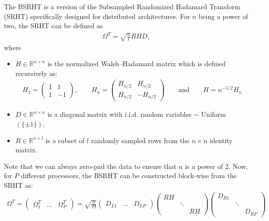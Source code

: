 \documentclass{article}
\theoremstyle{definition}
\begin{document}
The BSRHT is a version of the Subsampled Randomized Hadamard Transform (SRHT)
specifically designed for distributed architectures. For $n$ being a power of
two, the SRHT can be defined as
\begin{align*}
    \Omega^T = \sqrt{\frac{n}{l}} R H D,
\end{align*}
where
\begin{itemize}
    \item $H\in \mathbb{R}^{n \times n}$ is the normalized Walsh–Hadamard matrix
            which is defined recursively as:
    \begin{align*}
        H_2 = \begin{pmatrix}
            1 & 1 \\
            1 & -1
        \end{pmatrix},
        \qquad
        H_n = \begin{pmatrix}
            H_{n/2} & H_{n/2}\\
            H_{n/2} & -H_{n/2}
        \end{pmatrix}
        \qquad \text{and} \qquad
        H = n^{-1/2} H_n
    \end{align*}
    \item $D\in \mathbb{R}^{n \times n}$ is a diagonal matrix with i.i.d. random
            variables $\sim$ Uniform$(\{\pm 1\})$.
    \item $R\in \mathbb{R}^{n \times l}$ is a subset of $l$ randomly sampled
            rows from the $n \times n$ identity matrix.
\end{itemize}
Note that we can always zero-pad the data to ensure that $n$ is a power of 2.
Now, for $P$ different processors, the BSRHT can be constructed block-wise from
the SRHT as:
\begin{align}
    \label{BRSHT}
    \Omega^T
    = \begin{pmatrix}
        \Omega_1^T & \ldots & \Omega_P^T
    \end{pmatrix}
    = \sqrt{\frac{n}{Pl}}
    \begin{pmatrix}
        D_{L1} & \ldots & D_{LP}
    \end{pmatrix}
    \begin{pmatrix}
        RH \\
        & \ddots \\
        && RH
    \end{pmatrix}
    \begin{pmatrix}
        D_{R1}\\
        & \ddots \\
        && D_{RP}
    \end{pmatrix}
\end{align}
\end{document}
